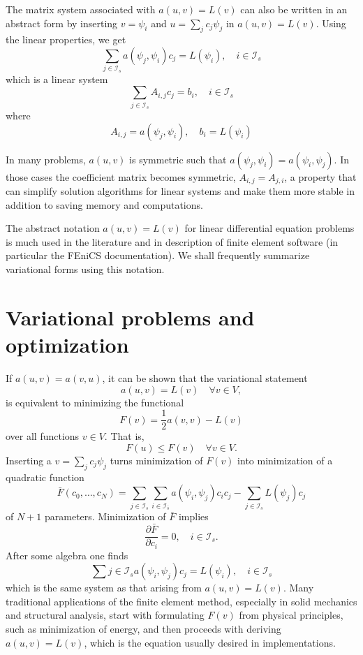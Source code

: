 \documentclass[../main.tex]{subfiles}
\begin{document}
	The matrix system associated with $a(u, v)=L(v)$ can also be written in an abstract form by inserting $v=\psi_{i}$ and $u=\sum_{j} c_{j} \psi_{j}$ in $a(u, v)=L(v)$. Using the linear properties, we get
	$$
	\sum_{j \in \mathcal{I}_{s}} a\left(\psi_{j}, \psi_{i}\right) c_{j}=L\left(\psi_{i}\right), \quad i \in \mathcal{I}_{s}
	$$
	which is a linear system
	$$
	\sum_{j \in \mathcal{I}_{s}} A_{i, j} c_{j}=b_{i}, \quad i \in \mathcal{I}_{s}
	$$
	where
	$$
	A_{i, j}=a\left(\psi_{j}, \psi_{i}\right), \quad b_{i}=L\left(\psi_{i}\right)
	$$
	
	\noindent In many problems, $a(u, v)$ is symmetric such that $a\left(\psi_{j}, \psi_{i}\right)=a\left(\psi_{i}, \psi_{j}\right)$. In those cases the coefficient matrix becomes symmetric, $A_{i, j}=A_{j, i}$, a property that can simplify solution algorithms for linear systems and make them more stable in addition to saving memory and computations.
	
	The abstract notation $a(u, v)=L(v)$ for linear differential equation problems is much used in the literature and in description of finite element software (in particular the FEniCS documentation). We shall frequently summarize variational forms using this notation.
	
\section[Basic principles for approximating differential equations]{Variational problems and optimization} 
	\label{sec:sec_11_13}
	
	
	\noindent If $a(u, v)=a(v, u)$, it can be shown that the variational statement
	$$
	a(u, v)=L(v) \quad \forall v \in V,
	$$
	is equivalent to minimizing the functional
	$$
	F(v)=\frac{1}{2} a(v, v)-L(v)
	$$
	over all functions $v \in V$. That is,
	$$
	F(u) \leq F(v) \quad \forall v \in V .
	$$
	Inserting a $v=\sum_{j} c_{j} \psi_{j}$ turns minimization of $F(v)$ into minimization of a quadratic function
	$$
	\bar{F}\left(c_{0}, \ldots, c_{N}\right)=\sum_{j \in \mathcal{I}_{s}} \sum_{i \in \mathcal{I}_{\bar{s}}} a\left(\psi_{i}, \psi_{j}\right) c_{i} c_{j}-\sum_{j \in \mathcal{I}_{s}} L\left(\psi_{j}\right) c_{j}
	$$
	of $N+1$ parameters.
	Minimization of $\bar{F}$ implies
	$$
	\frac{\partial \bar{F}}{\partial c_{i}}=0, \quad i \in \mathcal{I}_{s} .
	$$
	After some algebra one finds
	$$
	\sum j \in \mathcal{I}_{s} a\left(\psi_{i}, \psi_{j}\right) c_{j}=L\left(\psi_{i}\right), \quad i \in \mathcal{I}_{s}
	$$
	which is the same system as that arising from $a(u, v)=L(v)$.\bigbreak 
	Many traditional applications of the finite element method, especially in solid mechanics and structural analysis, start with formulating $F(v)$ from physical principles, such as minimization of energy, and then proceeds with deriving $a(u, v)=L(v)$, which is the equation usually desired in implementations.

	
\clearpage
\end{document}
